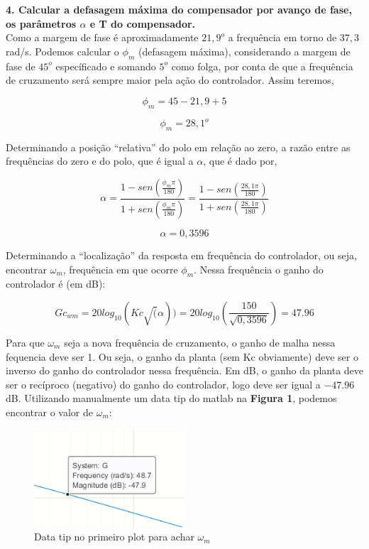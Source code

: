 
\textbf{4. Calcular a defasagem máxima do compensador por avanço de fase, os parâmetros $\alpha$ e T do compensador.}\\

Como a margem de fase é aproximadamente $21,9^o$ a frequência em torno de $37,3$ rad/s. Podemos calcular o $\phi_m$ (defasagem máxima), considerando a margem de fase de $45^o$ específicado e somando $5^o$ como folga, por conta de que a frequência de cruzamento será sempre maior pela ação do controlador. Assim teremos, 

\[\phi_m = 45 - 21,9 + 5\]

{\color{red}\[ \boxed{\phi_m = 28,1^o} \]}

Determinando a posição ``relativa'' do polo em relação ao zero, a razão entre as frequências do zero e do polo, que é igual a $\alpha$, que é dado por,

\[ \alpha = \dfrac{1-sen(\frac{\phi_m \pi}{180})}{1+sen(\frac{\phi_m \pi}{180})} = \dfrac{1-sen(\frac{28,1\pi}{180})}{1+sen(\frac{28,1 \pi}{180})} \]

{\color{red}\[ \boxed{\alpha = 0,3596} \]}

Determinando a ``localização'' da resposta em frequência do controlador, ou seja, encontrar $\omega_m$, frequência em que ocorre $\phi_m$. Nessa frequência o ganho do controlador é (em dB):

\[ Gc_{wm}=20log_{10}(Kc\sqrt(\alpha)) = 20log_{10}(\frac{150}{\sqrt{0,3596}}) = 47.96 \]

Para que $\omega_m$ seja a nova frequência de cruzamento, o ganho de malha nessa fequencia deve ser 1. Ou seja, o ganho da planta (sem Kc obviamente) deve ser o inverso do ganho do controlador nessa frequência. Em dB, o ganho da planta deve ser o recíproco (negativo) do ganho do controlador, logo deve ser igual a $-47.96$ dB. Utilizando manualmente um data tip do matlab na \textbf{Figura 1}, podemos encontrar o valor de $\omega_m$:

\begin{figure}[H]
  \centering
  \includegraphics[width=0.5\textwidth]{images/fig3.png}
  \caption{Data tip no primeiro plot para achar $\omega_m$}
\end{figure} \newpage

